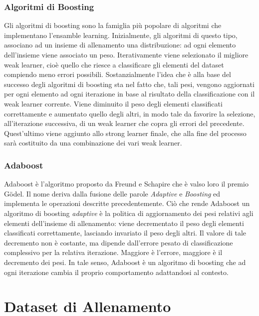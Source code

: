             \subsubsection{Algoritmi di Boosting}
                Gli algoritmi di boosting sono la famiglia più popolare di algoritmi che implementano l'ensamble learning.
                Inizialmente, gli algoritmi di questo tipo, associano ad un insieme di allenamento una distribuzione: ad ogni elemento dell'insieme viene associato un peso.
                Iterativamente viene selezionato il migliore weak learner, cioè quello che riesce a classificare gli elementi del dataset compiendo meno errori possibili.
                Sostanzialmente l'idea che è alla base del successo degli algoritmi di boosting sta nel fatto che, tali pesi, vengono aggiornati per ogni elemento ad ogni iterazione in base al risultato della classificazione con il weak learner corrente. Viene diminuito il peso degli elementi classificati correttamente e aumentato quello degli altri, in modo tale da favorire la selezione, all'iterazione successiva, di un weak learner che copra gli errori del precedente.
                Quest'ultimo viene aggiunto allo strong learner finale, che alla fine del processo sarà costituito da una combinazione dei vari weak learner.

            \subsubsection{Adaboost}
                Adaboost è l'algoritmo proposto da Freund e Schapire che è valso loro il premio Gödel.
                Il nome deriva dalla fusione delle parole \emph{Adaptive} e \emph{Boosting} ed implementa le operazioni descritte precedentemente.
                Ciò che rende Adaboost un algoritmo di boosting \emph{adaptive} è la politica di aggiornamento dei pesi relativi agli elementi dell'insieme di allenamento: viene decrementato il peso degli elementi classificati correttamente, lasciando invariato il peso degli altri.
                Il valore di tale decremento non è costante, ma dipende dall'errore pesato di classificazione complessivo per la relativa iterazione. Maggiore è l'errore, maggiore è il decremento dei pesi.
                In tale senso, Adaboost è un algoritmo di boosting che ad ogni iterazione cambia il proprio comportamento adattandosi al contesto.

    \section{Dataset di Allenamento}
    \label{sec:training_dataset}
